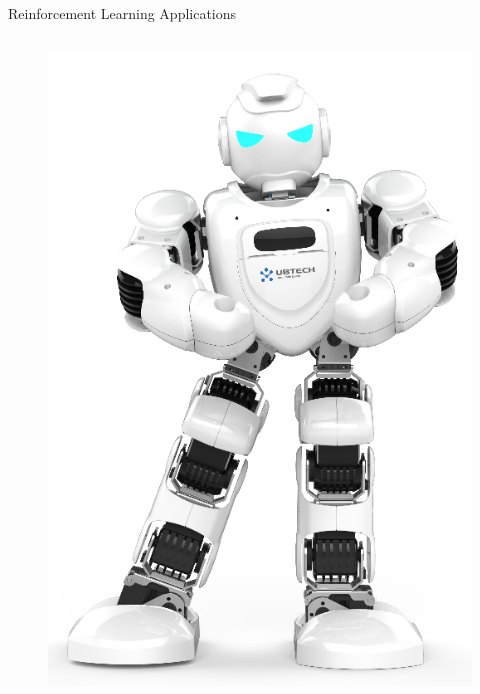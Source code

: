 \begin{frame}{Reinforcement Learning Applications}
\begin{columns}
	\onslide<+->
	\begin{column}{0.35\textwidth}
	\begin{figure}
		\centering
		\includegraphics[width=0.7\linewidth]{Images/robotics}
	\end{figure}
	\end{column}
\end{columns}
\end{frame}





%



%



